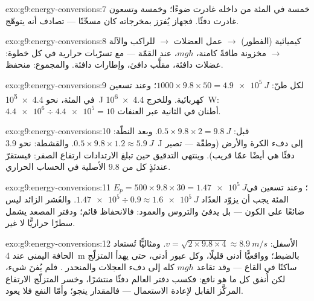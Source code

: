 \begin{solution}{exo:g9:energy-conversions:7}
خمسة في المئة من داخله غادرت ضوءًا؛ وخمسة وتسعون غادرت دفئًا.
فجهاز يُفرَز بمخرجاته كان مسخّنًا --- تصادف أنه يتوهّج.
\end{solution}

\begin{solution}{exo:g9:energy-conversions:8}
كيميائية (الفطور) $\to$ عمل العضلات $\to$  للراكب
والآلة $\to$ مخزونة طاقةً كامنة، $m g h$، عند القمّة --- مع
تسرّبات حرارية في كل خطوة: عضلات دافئة،  مقلَّب دافئ،
وإطارات دافئة. والمجموع: منحفظ.
\end{solution}

\begin{solution}{exo:g9:energy-conversions:9}
لكل طنّ: $1000 \times 9.8 \times 50 = \qty{4.9e5}{J}$؛ وعند
تسعين في المئة، نحو \qty{4.4e5}{J} كهربائية. وللخرج
\qty{4.4e6}{W}: $\num{4.4e6} \div \num{4.4e5} = 10$ أطنان في
الثانية عبر العنفات.
\end{solution}

\begin{solution}{exo:g9:energy-conversions:10}
قبل: $0.5 \times 9.8 \times 2 = \qty{9.8}{J}$. وبعد النطّة:
$0.5 \times 9.8 \times 1.2 \approx \qty{5.9}{J}$. والقشطة:
نحو \qty{3.9}{J} إلى دفء الكرة والأرض (وطقّة  --- تصير
دفئًا هي أيضًا عمّا قريب). وينتهي التدقيق حين تبلغ الارتدادات
ارتفاع الصفر: فيستقرّ عندئذٍ كل  من $9.8$ الأصلية في الحساب
الحراري.
\end{solution}

\begin{solution}{exo:g9:energy-conversions:11}
$E_p = 500 \times 9.8 \times 30 = \qty{1.47e5}{J}$؛ وعند
تسعين في المئة يجب أن يزوّد العدّاد $\num{1.47e5} \div 0.9
\approx \qty{1.6e5}{J}$. والعُشر الزائد ليس ضائعًا على الكون
--- بل يدفئ  والتروس والعمود: فالانحفاظ قائم؛ ودفتر
المصعد يشمل سطرًا حراريًّا لا غير.
\end{solution}

\begin{solution}{exo:g9:energy-conversions:12}
 الأسفل: $v = \sqrt{2 \times 9.8 \times 4} \approx
\qty{8.9}{m/s}$. ومثاليًّا تُستعاد الحافة اليمنى عند
\qty{4}{m} بالضبط؛ وواقعيًّا أدنى قليلًا، وكل عبور أدنى، حتى
يهدأ المتزلّج ساكنًا في القاع --- وقد تقاعد $m g h$ كله إلى
دفء العجلات والمنحدر . فلم يُفنَ شيء، لكن أُنفق كل ما
هو نافع: فكسب دفتر العالم دفئًا منتشرًا، وخسر المتزلّج
الارتفاع المركَّز القابل لإعادة الاستعمال --- فالمقدار ينجو؛
وأمّا النفع فلا يعود.
\end{solution}


